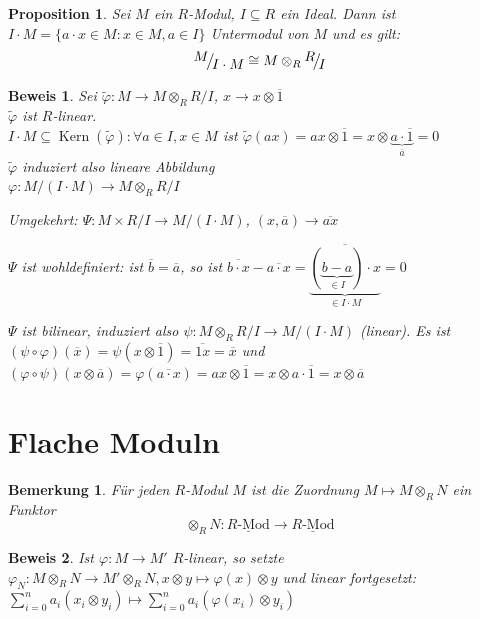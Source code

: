 \documentclass[a4paper,12pt]{scrbook}
\theoremstyle{break}
\newtheorem{Bem}[Def]{Bemerkung}
\newtheorem{Prop}[Def]{Proposition}
\theoremstyle{nonumberbreak}
\newtheorem{Bew}{Beweis}
\theoremstyle{nonumberplain}
\DeclareMathOperator{\Kern}{Kern}
\newcommand{\FakRaum}[2]{
  \raisebox{0.7ex}{\ensuremath{#1}}
  \ensuremath{\mkern-3mu}\big/\ensuremath{\mkern-3mu}
  \raisebox{-0.6ex}{\ensuremath{#2}}}
\begin{document}
\begin{Prop}
  Sei $M$ ein $R$-Modul, $I \subseteq R$ ein Ideal. Dann ist $I \cdot M = 
  \{ a \cdot x \in M: x \in M, a \in I \}$ Untermodul von $M$ und es gilt: \\
  $$\FakRaum{M}{I \cdot M} \cong M \otimes_R \FakRaum{R}{I}$$
\end{Prop}

\begin{Bew}
  Sei $\tilde{\varphi}: M \rightarrow M \otimes_R R/I$, 
  $ x \rightarrow x \otimes \overline{1}$\\
  $\tilde{\varphi}$  ist $R$-linear.\\
  $I \cdot M \subseteq \Kern(\tilde{\varphi}): \forall a \in I, x \in M$ ist
  $\tilde{\varphi}(ax) = ax \otimes \overline 1 = x \otimes \underbrace{ a \cdot \overline{1} }_{\overline a} = 0$\\
  $\tilde{\varphi}$ induziert also lineare Abbildung\\
  $\varphi: M/({I \cdot M}) \rightarrow M \otimes_R R/I$

  Umgekehrt: $\Psi: M \times R/I \rightarrow M /({I \cdot M})$, $(x, \overline a) \rightarrow \overline{ax}$

  $\Psi$ ist wohldefiniert: ist $\overline b = \overline a$, so ist $\overline{b \cdot x} - \overline{a \cdot x} =
  \overline{ \underbrace {( \underbrace{b-a}_{\in I}) \cdot x}_{ \in I \cdot M}} =0$

  $\Psi$ ist bilinear, induziert also $\psi: M \otimes_R R/I \rightarrow M/({I \cdot M})$ (linear). Es ist 
  $(\psi \circ \varphi)(\overline x )= \psi(x \otimes \overline 1 ) = \overline{1x} = \overline x$ und
  $(\varphi \circ \psi)(x \otimes \overline a ) = \varphi(\overline{a \cdot x }) = ax \otimes \overline 1 =
  x \otimes a\cdot \overline 1 = x \otimes \overline a$
\end{Bew}
\section{Flache Moduln}

\begin{Bem}
  Für jeden $R$-Modul $M$ ist die Zuordnung $M \mapsto M \otimes_R N$ ein Funktor
  \[\otimes_R N: \underline{R\mbox{-Mod}} \to \underline{R\mbox{-Mod}}\]
\end{Bem}

\begin{Bew} 
  Ist $\varphi: M \to M'$ $R$-linear, so setzte $\varphi_N: M \otimes_R N \to M'
  \otimes_R N, x \otimes y \mapsto \varphi(x) \otimes y$ und linear fortgesetzt: $\displaystyle
  \sum_{i=0}^n a_i(x_i \otimes y_i) \mapsto \sum_{i=0}^n a_i(\varphi(x_i) \otimes y_i)$
\end{Bew}
\end{document}
